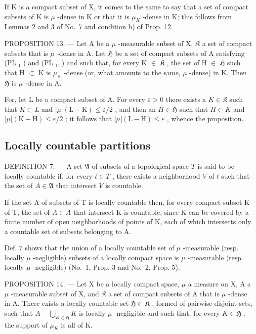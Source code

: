 If K is a compact subset of X, it comes to the same to say that a set of compact subsets of K is \(\mu\) -dense in K or that it is \(\mu_{K}\) -dense in K; this follows from Lemmas 2 and 3 of No.~7 and condition b) of Prop. 12.

PROPOSITION 13. --- Let A be a \(\mu\) -measurable subset of X, \(\mathfrak{K}\) a set of compact subsets that is \(\mu\) -dense in A. Let \(\mathfrak{H}\) be a set of compact subsets of A satisfying (PL \(_{\text{I}}\) ) and (PL \(_{\text{II}}\) ) and such that, for every K \(\in\) \(\mathfrak{K}\) , the set of H \(\in\) \(\mathfrak{H}\) such that H \(\subset\) K is \(\mu_{\text{K}}\) -dense (or, what amounts to the same, \(\mu\) -dense) in K. Then \(\mathfrak{H}\) is \(\mu\) -dense in A.

For, let L be a compact subset of A. For every \(\varepsilon > 0\) there exists a \(K \in \mathfrak{K}\) such that \(K \subset L\) and \(|\mu|(\mathrm{L} - \mathrm{K}) \leqslant \varepsilon/2\) , and then an \(H \in \mathfrak{H}\) such that \(H \subset K\) and \(|\mu|(\mathrm{K} - \mathrm{H}) \leqslant \varepsilon/2\) ; it follows that \(|\mu|(\mathrm{L} - \mathrm{H}) \leqslant \varepsilon\) , whence the proposition.

\subsection{Locally countable partitions}

DEFINITION 7. --- A set \(\mathfrak{A}\) of subsets of a topological space \(T\) is said to be locally countable if, for every \(t \in T\) , there exists a neighborhood \(V\) of \(t\) such that the set of \(A \in \mathfrak{A}\) that intersect \(V\) is countable.

If the set A of subsets of T is locally countable then, for every compact subset K of T, the set of \(A \in A\) that intersect K is countable, since K can be covered by a finite number of open neighborhoods of points of K, each of which intersects only a countable set of subsets belonging to A.

Def. 7 shows that the union of a locally countable set of \(\mu\) -measurable (resp. locally \(\mu\) -negligible) subsets of a locally compact space is \(\mu\) -measurable (resp. locally \(\mu\) -negligible) (No.~1, Prop. 3 and No.~2, Prop. 5).

PROPOSITION 14. --- Let X be a locally compact space, \(\mu\) a measure on X, A a \(\mu\) -measurable subset of X, and \(\mathfrak{K}\) a set of compact subsets of A that is \(\mu\) -dense in A. There exists a locally countable set \(\mathfrak{H} \subset \mathfrak{K}\) , formed of pairwise disjoint sets, such that \(A - \bigcup_{K \in \mathfrak{H}} K\) is locally \(\mu\) -negligible and such that, for every \(K \in \mathfrak{H}\) , the support of \(\mu_K\) is all of K.

